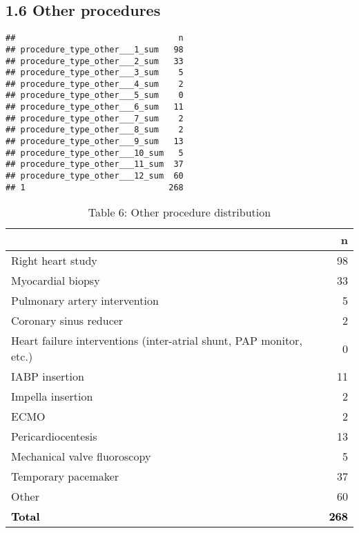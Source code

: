 \documentclass[
]{article}
\begin{document}
\hypertarget{other-procedures}{%
\subsection{1.6 Other procedures}\label{other-procedures}}

\begin{verbatim}
##                                 n
## procedure_type_other___1_sum   98
## procedure_type_other___2_sum   33
## procedure_type_other___3_sum    5
## procedure_type_other___4_sum    2
## procedure_type_other___5_sum    0
## procedure_type_other___6_sum   11
## procedure_type_other___7_sum    2
## procedure_type_other___8_sum    2
## procedure_type_other___9_sum   13
## procedure_type_other___10_sum   5
## procedure_type_other___11_sum  37
## procedure_type_other___12_sum  60
## 1                             268
\end{verbatim}

\begin{longtable}[t]{lr}
\caption{\label{tab:table 11}Table 6: Other procedure distribution}\\
\toprule
 & n\\
\midrule
Right heart study & 98\\
Myocardial biopsy & 33\\
Pulmonary artery intervention & 5\\
Coronary sinus reducer & 2\\
Heart failure interventions (inter-atrial shunt, PAP monitor, etc.) & 0\\
\addlinespace
IABP insertion & 11\\
Impella insertion & 2\\
ECMO & 2\\
Pericardiocentesis & 13\\
Mechanical valve fluoroscopy & 5\\
\addlinespace
Temporary pacemaker & 37\\
Other & 60\\
\textcolor{black}{\textbf{Total}} & \textcolor{black}{\textbf{268}}\\
\bottomrule
\end{longtable}
\end{document}
